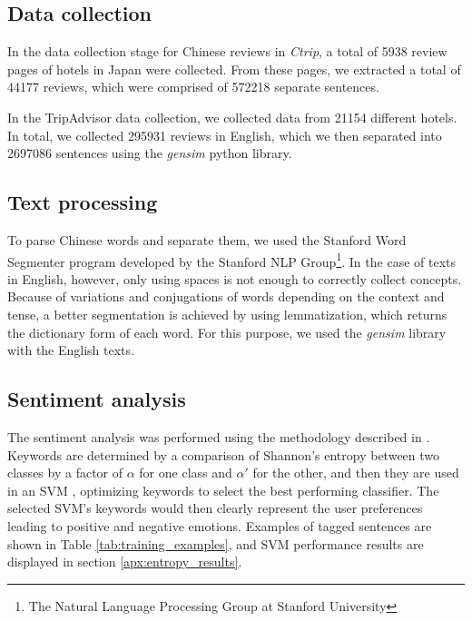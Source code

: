 \subsection{Data collection}\label{datacollection}

In the data collection stage for Chinese reviews in \textit{Ctrip}, a total of \num[group-separator={,}]{5938} review pages of hotels in Japan were collected. From these pages, we extracted a total of \num[group-separator={,}]{44177} reviews, which were comprised of \num[group-separator={,}]{572218} separate sentences. 

In the TripAdvisor data collection, we collected data from \num[group-separator={,}]{21154} different hotels. In total, we collected \num[group-separator={,}]{295931} reviews in English, which we then separated into \num[group-separator={,}]{2697086} sentences using the \textit{gensim} python library. 

\subsection{Text processing}\label{textprocessing}

To parse Chinese words and separate them, we used the Stanford Word Segmenter \cite[][]{chang2008} program developed by the Stanford NLP Group\footnote{\label{stanfordnlp}The Natural Language Processing Group at Stanford University}. In the case of texts in English, however, only using spaces is not enough to correctly collect concepts. Because of variations and conjugations of words depending on the context and tense, a better segmentation is achieved by using lemmatization, which returns the dictionary form of each word. For this purpose, we used the \textit{gensim} library with the English texts.

\subsection{Sentiment analysis}\label{sentimentanalysis}

The sentiment analysis was performed using the methodology described in \cite{Aleman2018ICAROB}. Keywords are determined by a comparison of Shannon's entropy \cite[][]{shannon1948} between two classes by a factor of \(\alpha\) for one class and \(\alpha'\) for the other, and then they are used in an SVM \cite[][]{cortes1995}, optimizing keywords to select the best performing classifier. The selected SVM's keywords would then clearly represent the user preferences leading to positive and negative emotions. Examples of tagged sentences are shown in Table \ref{tab:training_examples}, and SVM performance results are displayed in section \ref{apx:entropy_results}.

